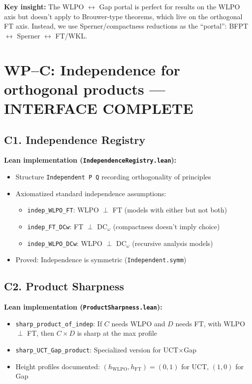\documentclass[11pt]{article}
\theoremstyle{definition}
\theoremstyle{remark}
\begin{document}
\textbf{Key insight:} The WLPO $\leftrightarrow$ Gap portal is perfect for results on the WLPO axis but doesn't apply to Brouwer-type theorems, which live on the orthogonal FT axis. Instead, we use Sperner/compactness reductions as the ``portal'': BFPT $\leftrightarrow$ Sperner $\leftrightarrow$ FT/WKL.

\section{WP–C: Independence for orthogonal products — \textbf{\color{green}INTERFACE COMPLETE}}

\subsection{C1. Independence Registry}

\textbf{Lean implementation (\texttt{IndependenceRegistry.lean}):}
\begin{itemize}
\item Structure \texttt{Independent P Q} recording orthogonality of principles
\item Axiomatized standard independence assumptions:
  \begin{itemize}
  \item \texttt{indep\_WLPO\_FT}: WLPO $\perp$ FT (models with either but not both)
  \item \texttt{indep\_FT\_DCw}: FT $\perp$ DC$_\omega$ (compactness doesn't imply choice)
  \item \texttt{indep\_WLPO\_DCw}: WLPO $\perp$ DC$_\omega$ (recursive analysis models)
  \end{itemize}
\item Proved: Independence is symmetric (\texttt{Independent.symm})
\end{itemize}

\subsection{C2. Product Sharpness}

\textbf{Lean implementation (\texttt{ProductSharpness.lean}):}
\begin{itemize}
\item \texttt{sharp\_product\_of\_indep}: If $C$ needs WLPO and $D$ needs FT, with WLPO $\perp$ FT, then $C \times D$ is sharp at the max profile
\item \texttt{sharp\_UCT\_Gap\_product}: Specialized version for UCT$\times$Gap
\item Height profiles documented: $(h_{\text{WLPO}}, h_{\text{FT}}) = (0, 1)$ for UCT, $(1, 0)$ for Gap
\end{itemize}
\end{document}
